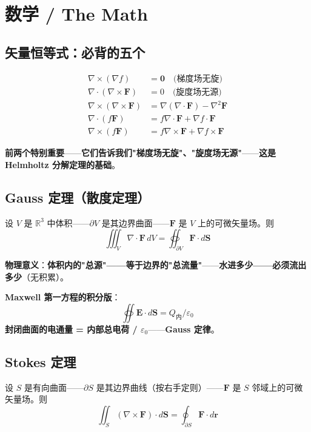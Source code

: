 \section{数学 / The Math}

\subsection{矢量恒等式：必背的五个}

\begin{align}
\nabla \times (\nabla f) &= \bm{0} \quad \text{(梯度场无旋)} \\
\nabla \cdot (\nabla \times \bm{F}) &= 0 \quad \text{(旋度场无源)} \\
\nabla \times (\nabla \times \bm{F}) &= \nabla(\nabla \cdot \bm{F}) - \nabla^2 \bm{F} \\
\nabla \cdot (f \bm{F}) &= f \nabla \cdot \bm{F} + \nabla f \cdot \bm{F} \\
\nabla \times (f \bm{F}) &= f \nabla \times \bm{F} + \nabla f \times \bm{F}
\end{align}

\textbf{前两个特别重要}——\textbf{它们告诉我们"梯度场无旋"、"旋度场无源"}——\textbf{这是 Helmholtz 分解定理的基础}。

\subsection{Gauss 定理（散度定理）}

\begin{theorem}
设 $V$ 是 $\mathbb{R}^3$ 中体积——$\partial V$ 是其边界曲面——$\bm{F}$ 是 $V$ 上的可微矢量场。则
\[
\iiint_V \nabla \cdot \bm{F} \, dV = \oiint_{\partial V} \bm{F} \cdot d\bm{S}
\]
\end{theorem}

\textbf{物理意义}：\textbf{体积内的"总源"——等于边界的"总流量"}——\textbf{水进多少——必须流出多少}（无积累）。

\textbf{Maxwell 第一方程的积分版}：
\[
\oiint \bm{E} \cdot d\bm{S} = Q_{\text{内}} / \varepsilon_0
\]
\textbf{封闭曲面的电通量 = 内部总电荷 / $\varepsilon_0$}——\textbf{Gauss 定律}。

\subsection{Stokes 定理}

\begin{theorem}[Stokes 定理]
设 $S$ 是有向曲面——$\partial S$ 是其边界曲线（按右手定则）——$\bm{F}$ 是 $S$ 邻域上的可微矢量场。则
\[
\iint_S (\nabla \times \bm{F}) \cdot d\bm{S} = \oint_{\partial S} \bm{F} \cdot d\bm{r}
\]
\end{theorem}

